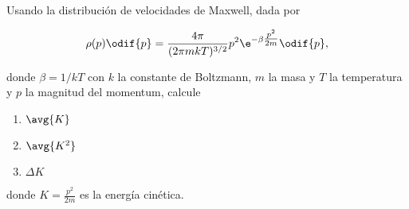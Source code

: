 \documentclass[../main.tex]{subfiles}
\begin{document}
\begin{problema}[10]
	Usando la distribución de velocidades de Maxwell, dada por

	\begin{equation*}
		\rho(p)\odif{p} = \dfrac{4\pi}{(2\pi m k T)^{3/2}}p^{2}\e^{-\beta \tfrac{p^{2}}{2m}}\odif{p},
	\end{equation*}

	donde \(\beta = 1/kT\) con \(k\) la constante de Boltzmann,
	\(m\) la masa y \(T\) la temperatura y
	\(p\) la magnitud del momentum, calcule

	\begin{enumerate}
		\item \(\avg{K}\)
		\item \(\avg{K^{2}}\)
		\item \(\Delta K\)
	\end{enumerate}

	donde \(K = \tfrac{p^{2}}{2m}\) es la energía cinética.
\end{problema}
\end{document}
